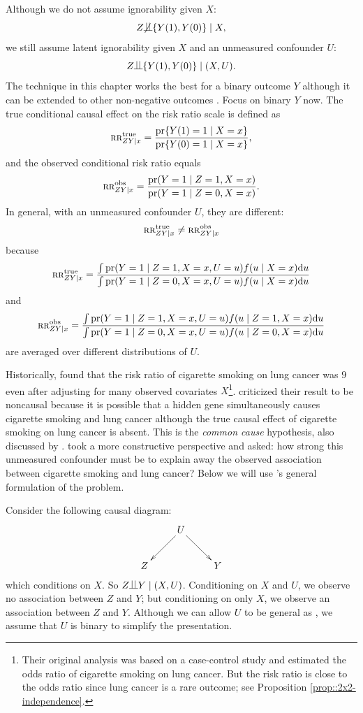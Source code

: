 Although we do not assume ignorability given $X$:
$$
Z\nind \{  Y(1), Y(0) \} \mid X ,
$$
we still assume latent ignorability given $X$ and an unmeasured confounder $U$: 
$$
Z\ind \{  Y(1), Y(0) \} \mid (X, U) . 
$$
The technique in this chapter works the best for a binary outcome $Y$ although it can be extended to other non-negative outcomes \citep{ding2016sensitivity}. Focus on binary $Y$ now. The true conditional causal effect on the risk ratio scale is defined as 
$$
\textsc{rr}_{ZY\mid x}^{\textup{true}} = \frac{  \textup{pr}\{ Y(1) = 1\mid X=x  \} }{ \textup{pr}\{ Y(0) = 1\mid X=x  \} },
$$
and the observed conditional risk ratio equals 
$$
\textsc{rr}_{ZY\mid x}^{\textup{obs}} = \frac{  \textup{pr}( Y  = 1\mid Z=1, X=x  ) }{ \textup{pr}( Y  = 1\mid  Z=0, X=x  ) }.
$$
In general, with an unmeasured confounder $U$,  they are different:
$$
\textsc{rr}_{ZY\mid x}^{\textup{true}}  \neq \textsc{rr}_{ZY\mid x}^{\textup{obs}} 
$$ 
because
$$
\textsc{rr}_{ZY\mid x}^{\textup{true}} = \frac{  \int  \textup{pr}( Y = 1\mid Z=1, X=x, U=u  )  f(u \mid X=x) \textup{d} u }
{ \int \textup{pr}( Y = 1\mid Z=0,  X=x , U=u  )  f(u \mid X=x) \textup{d} u }
$$
and
$$
\textsc{rr}_{ZY\mid x}^{\textup{obs}} = \frac{ \int   \textup{pr}( Y  = 1\mid Z=1, X=x , U=u ) f(u \mid Z=1, X=x) \textup{d} u   }
{ \int  \textup{pr}( Y  = 1\mid  Z=0, X=x, U=u  ) f(u \mid Z=0, X=x) \textup{d} u  } 
$$
are averaged over different distributions of $U$. 


Historically,  \citet{doll1950smoking} found that the risk ratio of cigarette smoking on lung cancer was $9$ even after adjusting for many observed covariates $X$\footnote{Their original analysis was based on a case-control study and estimated the odds ratio of cigarette smoking on lung cancer. But the risk ratio is close to the odds ratio since lung cancer is a rare outcome; see Proposition \ref{prop::2x2-independence}.}. \citet{Fisher::1957} criticized their result to be noncausal because it is possible that a hidden gene simultaneously causes cigarette smoking and lung cancer although the true causal effect of cigarette smoking on lung cancer is absent. This is the {\it common cause} hypothesis, also discussed by \citet{reichenbach1991direction}. \citet{Cornfield::1959} took a more constructive perspective and asked: how strong this unmeasured confounder must be to explain away the observed association between cigarette smoking and lung cancer? Below we will use  \citet{ding2016sensitivity}'s general formulation of the problem. 


Consider the following causal diagram:
$$
\xymatrix{
 &U \ar[dl] \ar[dr] \\
 Z   && Y 
}
$$
which conditions on $X$. So $Z\ind Y\mid (X, U)$. Conditioning on $X$ and $U$, we observe no association between $Z$ and $Y$; but conditioning on only $X$, we observe an association between $Z$ and $Y$.  Although we can allow $U$ to be general as \citet{ding2016sensitivity}, we assume that $U$ is binary to simplify the presentation. 


